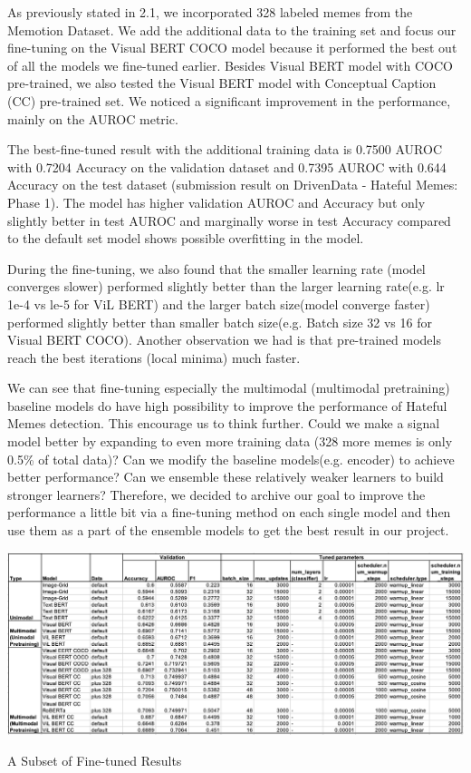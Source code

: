 \documentclass[10pt,twocolumn,letterpaper]{article}
\begin{document}
As previously stated in 2.1, we incorporated 328 labeled memes from the Memotion Dataset. We add the additional data to the training set and focus our fine-tuning on the Visual BERT COCO model because it performed the best out of all the models we fine-tuned earlier. Besides Visual BERT model with COCO pre-trained, we also tested the Visual BERT model with Conceptual Caption (CC) pre-trained set. We noticed a significant improvement in the performance, mainly on the AUROC metric.

The best-fine-tuned result with the additional training data is 0.7500 AUROC with 0.7204 Accuracy on the validation dataset and 0.7395 AUROC with 0.644 Accuracy on the test dataset (submission result on DrivenData - Hateful Memes: Phase 1). The model has higher validation AUROC and Accuracy but only slightly better in test AUROC and marginally worse in test Accuracy compared to the default set model shows possible overfitting in the model.

During the fine-tuning, we also found that the smaller learning rate (model converges slower) performed slightly better than the larger learning rate(e.g. lr 1e-4 vs le-5 for ViL BERT) and the larger batch size(model converge faster) performed slightly better than smaller batch size(e.g. Batch size 32 vs 16 for Visual BERT COCO). Another observation we had is that pre-trained models reach the best iterations (local minima) much faster. 

We can see that fine-tuning especially the multimodal (multimodal pretraining) baseline models do have high possibility to improve the performance of Hateful Memes detection. This encourage us to think further. Could we make a signal model better by expanding to even more training data (328 more memes is only 0.5\% of total data)? Can we modify the baseline models(e.g. encoder) to achieve better performance? Can we ensemble these relatively weaker learners to build stronger learners? Therefore, we decided to archive our goal to improve the performance a little bit via a fine-tuning method on each single model and then use them as a part of the ensemble models to get the best result in our project.


\begin{table}[h]
\begin{center}
\includegraphics[scale=0.58]{images/fine-tuned.png}
\caption{A Subset of Fine-tuned Results}
\end{center}
\end{table}
\end{document}

